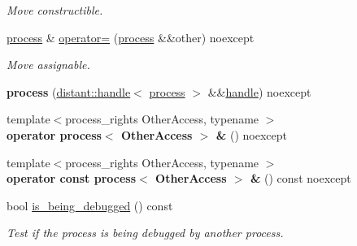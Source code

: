\begin{DoxyCompactItemize}
\begin{DoxyCompactList}\small\item\em Move constructible. \end{DoxyCompactList}\item 
\mbox{\label{classdistant_1_1kernel__objects_1_1process_aacea90575aaa7e9c84e2f80fa93fe62f}} 
\mbox{\hyperlink{classdistant_1_1kernel__objects_1_1process}{process}} \& \mbox{\hyperlink{classdistant_1_1kernel__objects_1_1process_aacea90575aaa7e9c84e2f80fa93fe62f}{operator=}} (\mbox{\hyperlink{classdistant_1_1kernel__objects_1_1process}{process}} \&\&other) noexcept
\begin{DoxyCompactList}\small\item\em Move assignable. \end{DoxyCompactList}\item 
\mbox{\label{classdistant_1_1kernel__objects_1_1process_a83240e5580484794f24fcd57851e8c6f}} 
{\bfseries process} (\mbox{\hyperlink{classdistant_1_1handle}{distant\+::handle}}$<$ \mbox{\hyperlink{classdistant_1_1kernel__objects_1_1process}{process}} $>$ \&\&\mbox{\hyperlink{classdistant_1_1handle}{handle}}) noexcept
\item 
\mbox{\label{classdistant_1_1kernel__objects_1_1process_a02b13d92ae5626f6816b3b17cb930cc3}} 
{\footnotesize template$<$process\+\_\+rights Other\+Access, typename $>$ }\\{\bfseries operator process$<$ Other\+Access $>$ \&} () noexcept
\item 
\mbox{\label{classdistant_1_1kernel__objects_1_1process_aed99eb2084963e9fe73278f845f2da39}} 
{\footnotesize template$<$process\+\_\+rights Other\+Access, typename $>$ }\\{\bfseries operator const process$<$ Other\+Access $>$ \&} () const noexcept
\item 
bool \mbox{\hyperlink{classdistant_1_1kernel__objects_1_1process_a9acb308895639407b1925ad238f05344}{is\+\_\+being\+\_\+debugged}} () const
\begin{DoxyCompactList}\small\item\em Test if the process is being debugged by another process. \end{DoxyCompactList}\item 

\end{DoxyCompactItemize}
